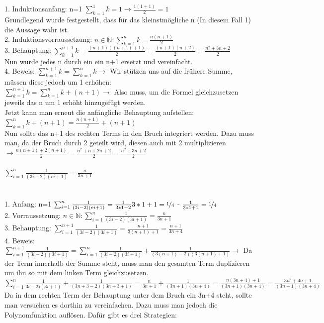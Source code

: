\documentclass{article}
\newcommand{\paragraphlb}[1]{\paragraph{#1}\mbox{}\\}
\newcommand{\N}{\mathbb{N}}
\begin{document}
	1. Induktionsanfang: n=1 $\sum^{1}_{k=1}{k} = 1 \to \frac{1(1+1)}{2} = 1$ \\
	Grundlegend wurde festgestellt, dass für das kleinstmögliche n (In diesem Fall 1) die Aussage wahr ist. \\
	2. Induktionsvorraussetzung: $n\in \N:\sum^{n}_{k=1}{k}=\frac{n(n+1)}{2}$ \\
	3. Behauptung: $\sum^{n+1}_{k=1}{k}=\frac{(n+1)((n+1)+1)}{2}=\frac{(n+1)(n+2)}{2}=\frac{n^2+3n+2}{2}$ \\
	Nun wurde jedes n durch ein ein n+1 ersetzt und vereinfacht. \\
	4. Beweis: $\sum^{n+1}_{k=1}{k}=\sum^{n}_{k=1}{k} \to$ Wir stützen uns auf die frühere Summe, müssen diese jedoch um 1 erhöhen: \\
	$\sum^{n+1}_{k=1}{k}=\sum^{n}_{k=1}{k+(n+1)} \to$ Also muss, um die Formel gleichzusetzen jeweils das n um 1 erhöht hinzugefügt werden. \\
	Jetzt kann man erneut die anfängliche Behauptung aufstellen: $\sum^{n}_{k=1}{k+(n+1)} = \frac{n(n+1)}{2}+(n+1)$ \\
	Nun sollte das n+1 des rechten Terms in den Bruch integriert werden. Dazu muss man, da der Bruch durch 2 geteilt wird, diesen auch mit 2 multiplizieren $\to \frac{n(n+1)+2(n+1)}{2}=\frac{n^2+n+2n+2}{2}=\frac{n^2+3n+2}{2}$
	\paragraphlb{$\sum^{n}_{i=1}{\frac{1}{(3i-2)(ei+1)}}=\frac{n}{3n+1}$}
	1. Anfang: n=1 $\sum^{n}_{i=1}{\frac{1}{(3i-2)(ei+1)}}=\frac{1}{3*1-2}{3*1+1}=\nicefrac{1}{4}$ - $\frac{1}{3*1+1}=\nicefrac{1}{4}$ \\
	2. Vorraussetzung: $n\in\N:\sum^{n}_{i=1}{\frac{1}{(3i-2)(3i+1)}}=\frac{n}{3n+1}$ \\
	3. Behauptung: $\sum^{n+1}_{i=1}{\frac{1}{(3i-2)(3i+1)}}=\frac{n+1}{3(n+1)+1}=\frac{n+1}{3n+4}$ \\
	4. Beweis: $\sum^{n+1}_{i=1}{\frac{1}{(3i-2)(3i+1)}}=\sum^{n}_{i=1}{\frac{1}{(3i-2)(3i+1)}}+\frac{1}{(3(n+1)-2)(3(n+1)+1)} \to$ Da der Term innerhalb der Summe steht, muss man den gesamten Term duplizieren um ihn so mit dem linken Term gleichzusetzen. \\
	$\sum^{n}_{i=1}{\frac{1}{3i-2)(3i+1)}}+\frac{1}{(3n+3-2)(3n+3+1)} = \frac{n}{3n+1}+\frac{1}{(3n+1)(3n+4)} = \frac{n(3n+4)+1}{(3n+1)(3n+4)}=\frac{3n^2+4n+1}{(3n+1)(3n+4)}$\\
	Da in dem rechten Term der Behauptung unter dem Bruch ein 3n+4 steht, sollte man versuchen es dorthin zu vereinfachen. Dazu muss man jedoch die Polynomfunktion auflösen. Dafür gibt es drei Strategien:
\end{document}
